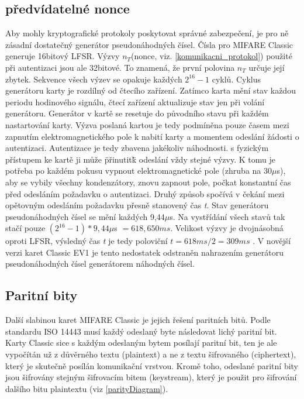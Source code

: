 \subsection{předvídatelné nonce}
Aby mohly kryptografické protokoly poskytovat správné zabezpečení, je pro ně zásadní dostatečný generátor pseudonáhodných čísel. Čísla pro MIFARE Classic generuje 16bitový LFSR. Výzvy $n_T$(nonce, viz. \ref{komunikacni_protokol}) použité při autentizaci jsou ale 32bitové. To znamená, že první polovina $n_T$ určuje její zbytek. Sekvence všech výzev se opakuje každých $2^{16} - 1$ cyklů\cite{Cryptanalisis}. Cyklus generátoru karty je rozdílný od čtecího zařízení. Zatímco karta mění stav každou periodu hodinového signálu, čtecí zařízení aktualizuje stav jen při volání generátoru\cite{Dismantling_Mifare_Classic}. Generátor v kartě se resetuje do původního stavu při každém nastartování karty. Výzva poslaná kartou je tedy podmíněna pouze časem mezi zapnutím elektromagnetického pole k nabití karty a momentem odeslání žádosti o autentizaci. Autentizace je tedy zbavena jakékoliv náhodnosti.  s fyzickým přístupem ke kartě ji může \"přinutit\" k odeslání vždy stejné výzvy. K tomu je potřeba po každém pokusu vypnout elektromagnetické pole (zhruba na 30$\mu$s), aby se vybily všechny kondenzátory, znovu zapnout pole, počkat konstantní čas před odesláním požadavku o autentizaci. Druhý způsob spočívá v čekání mezi opětovným odesláním požadavku přesně stanovený čas \emph{t}. Stav generátoru pseudonáhodných čísel se mění každých 9,44$\mu$s. Na vystřídání všech stavů tak stačí pouze $(2^{16} - 1) * 9,44\mu$s $= 618,650ms$. Velikost výzvy je dvojnásobná oproti LFSR, výsledný čas \emph{t} je tedy poloviční $t = 618ms/2 = 309ms$ \cite{Wirelessly_Pickpocketing}. V novější verzi karet Classic EV1 je tento nedostatek odstraněn nahrazením generátoru pseudonáhodných čísel generátorem náhodných čísel\cite{MIFARE_Classic_Official_about}.

\subsection{Paritní bity}
Další slabinou karet MIFARE Classic je jejich řešení paritních bitů. Podle standardu ISO 14443 musí každý odeslaný byte následovat lichý paritní bit. Karty Classic sice s každým odeslaným bytem posílají paritní bit, ten je ale vypočítán už z důvěrného textu (plaintext) a ne z textu šifrovaného (ciphertext), který je skutečně posílán komunikační vrstvou. Kromě toho, odeslané paritní bity jsou šifrovány stejným šifrovacím bitem (keystream), který je použit pro šifrování dalšího bitu plaintextu (viz \ref{parityDiagram})\cite{Cryptanalisis}.

